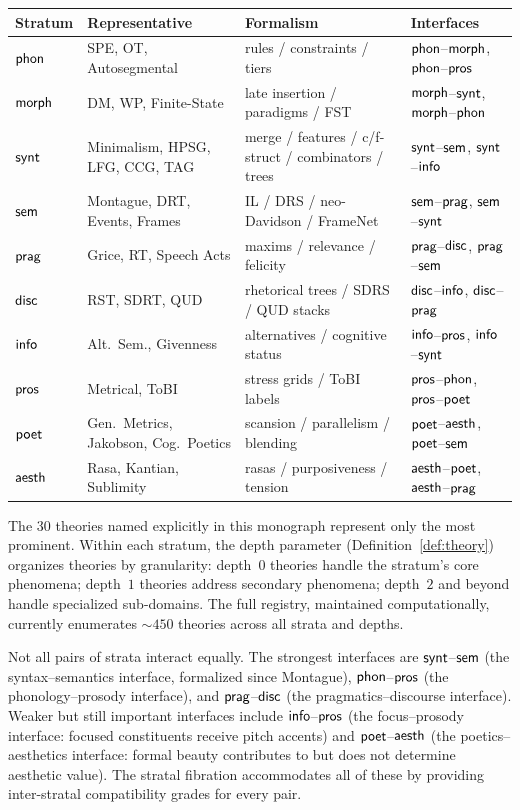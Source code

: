 \begin{center}
\small
\renewcommand{\arraystretch}{1.15}
\begin{tabular}{llp{4.5cm}l}
\textbf{Stratum} & \textbf{Representative} & \textbf{Formalism} &
  \textbf{Interfaces} \\
\hline
$\mathsf{phon}$ & SPE, OT, Autosegmental &
  rules / constraints / tiers &
  $\mathsf{phon}$--$\mathsf{morph}$, $\mathsf{phon}$--$\mathsf{pros}$ \\
$\mathsf{morph}$ & DM, WP, Finite-State &
  late insertion / paradigms / FST &
  $\mathsf{morph}$--$\mathsf{synt}$, $\mathsf{morph}$--$\mathsf{phon}$ \\
$\mathsf{synt}$ & Minimalism, HPSG, LFG, CCG, TAG &
  merge / features / c/f-struct / combinators / trees &
  $\mathsf{synt}$--$\mathsf{sem}$, $\mathsf{synt}$--$\mathsf{info}$ \\
$\mathsf{sem}$ & Montague, DRT, Events, Frames &
  IL / DRS / neo-Davidson / FrameNet &
  $\mathsf{sem}$--$\mathsf{prag}$, $\mathsf{sem}$--$\mathsf{synt}$ \\
$\mathsf{prag}$ & Grice, RT, Speech Acts &
  maxims / relevance / felicity &
  $\mathsf{prag}$--$\mathsf{disc}$, $\mathsf{prag}$--$\mathsf{sem}$ \\
$\mathsf{disc}$ & RST, SDRT, QUD &
  rhetorical trees / SDRS / QUD stacks &
  $\mathsf{disc}$--$\mathsf{info}$, $\mathsf{disc}$--$\mathsf{prag}$ \\
$\mathsf{info}$ & Alt.\ Sem., Givenness &
  alternatives / cognitive status &
  $\mathsf{info}$--$\mathsf{pros}$, $\mathsf{info}$--$\mathsf{synt}$ \\
$\mathsf{pros}$ & Metrical, ToBI &
  stress grids / ToBI labels &
  $\mathsf{pros}$--$\mathsf{phon}$, $\mathsf{pros}$--$\mathsf{poet}$ \\
$\mathsf{poet}$ & Gen.\ Metrics, Jakobson, Cog.\ Poetics &
  scansion / parallelism / blending &
  $\mathsf{poet}$--$\mathsf{aesth}$, $\mathsf{poet}$--$\mathsf{sem}$ \\
$\mathsf{aesth}$ & Rasa, Kantian, Sublimity &
  rasas / purposiveness / tension &
  $\mathsf{aesth}$--$\mathsf{poet}$, $\mathsf{aesth}$--$\mathsf{prag}$ \\
\end{tabular}
\end{center}

The 30 theories named explicitly in this monograph represent only the
most prominent.  Within each stratum, the depth parameter
(Definition~\ref{def:theory}) organizes theories by granularity:
depth~$0$ theories handle the stratum's core phenomena; depth~$1$
theories address secondary phenomena; depth~$2$ and beyond handle
specialized sub-domains.  The full registry, maintained
computationally, currently enumerates ${\sim}450$ theories across all
strata and depths.

\begin{remark}
Not all pairs of strata interact equally.  The strongest interfaces
are $\mathsf{synt}$--$\mathsf{sem}$ (the syntax--semantics interface, formalized
since Montague), $\mathsf{phon}$--$\mathsf{pros}$ (the phonology--prosody interface),
and $\mathsf{prag}$--$\mathsf{disc}$ (the pragmatics--discourse interface).  Weaker
but still important interfaces include $\mathsf{info}$--$\mathsf{pros}$ (the
focus--prosody interface: focused constituents receive pitch accents)
and $\mathsf{poet}$--$\mathsf{aesth}$ (the poetics--aesthetics interface: formal
beauty contributes to but does not determine aesthetic value).  The
stratal fibration accommodates all of these by providing inter-stratal
compatibility grades for every pair.
\end{remark}

